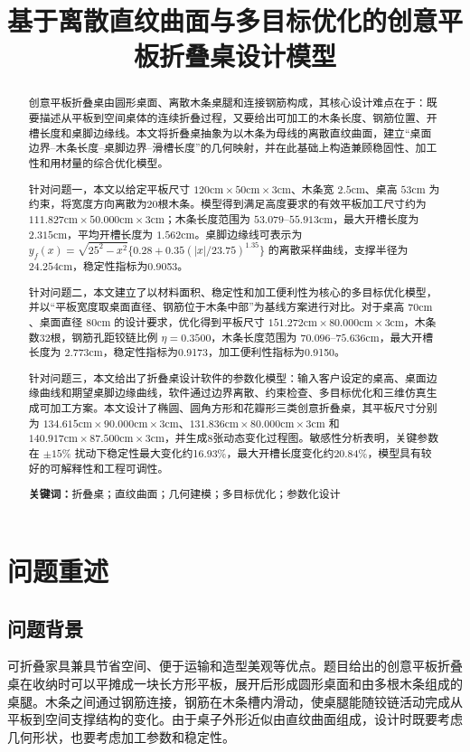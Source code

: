 \documentclass[UTF8,a4paper,12pt]{ctexart}
\title{\heiti 基于离散直纹曲面与多目标优化的创意平板折叠桌设计模型}
\author{}
\date{}
\newcommand{\cm}{\mathrm{cm}}
\begin{document}
\maketitle

\begin{abstract}
创意平板折叠桌由圆形桌面、离散木条桌腿和连接钢筋构成，其核心设计难点在于：既要描述从平板到空间桌体的连续折叠过程，又要给出可加工的木条长度、钢筋位置、开槽长度和桌脚边缘线。本文将折叠桌抽象为以木条为母线的离散直纹曲面，建立“桌面边界--木条长度--桌脚边界--滑槽长度”的几何映射，并在此基础上构造兼顾稳固性、加工性和用材量的综合优化模型。

针对问题一，本文以给定平板尺寸 $120\cm\times50\cm\times3\cm$、木条宽 $2.5\cm$、桌高 $53\cm$ 为约束，将宽度方向离散为20根木条。模型得到满足高度要求的有效平板加工尺寸约为 $111.827\cm\times50.000\cm\times3\cm$；木条长度范围为 $53.079$--$55.913\cm$，最大开槽长度为 $2.315\cm$，平均开槽长度为 $1.562\cm$。桌脚边缘线可表示为 $y_f(x)=\sqrt{25^2-x^2}\{0.28+0.35(|x|/23.75)^{1.35}\}$ 的离散采样曲线，支撑半径为 $24.254\cm$，稳定性指标为0.9053。

针对问题二，本文建立了以材料面积、稳定性和加工便利性为核心的多目标优化模型，并以“平板宽度取桌面直径、钢筋位于木条中部”为基线方案进行对比。对于桌高 $70\cm$、桌面直径 $80\cm$ 的设计要求，优化得到平板尺寸 $151.272\cm\times80.000\cm\times3\cm$，木条数32根，钢筋孔距铰链比例 $\eta=0.3500$，木条长度范围为 $70.096$--$75.636\cm$，最大开槽长度为 $2.773\cm$，稳定性指标为0.9173，加工便利性指标为0.9150。

针对问题三，本文给出了折叠桌设计软件的参数化模型：输入客户设定的桌高、桌面边缘曲线和期望桌脚边缘曲线，软件通过边界离散、约束检查、多目标优化和三维仿真生成可加工方案。本文设计了椭圆、圆角方形和花瓣形三类创意折叠桌，其平板尺寸分别为 $134.615\cm\times90.000\cm\times3\cm$、$131.836\cm\times80.000\cm\times3\cm$ 和 $140.917\cm\times87.500\cm\times3\cm$，并生成8张动态变化过程图。敏感性分析表明，关键参数在 $\pm15\%$ 扰动下稳定性最大变化约16.93\%，最大开槽长度变化约20.84\%，模型具有较好的可解释性和工程可调性。

\textbf{关键词：}折叠桌；直纹曲面；几何建模；多目标优化；参数化设计
\end{abstract}

\newpage
\tableofcontents
\newpage

\section{问题重述}
\subsection{问题背景}
可折叠家具兼具节省空间、便于运输和造型美观等优点。题目给出的创意平板折叠桌在收纳时可以平摊成一块长方形平板，展开后形成圆形桌面和由多根木条组成的桌腿。木条之间通过钢筋连接，钢筋在木条槽内滑动，使桌腿能随铰链活动完成从平板到空间支撑结构的变化。由于桌子外形近似由直纹曲面组成，设计时既要考虑几何形状，也要考虑加工参数和稳定性。
\end{document}
